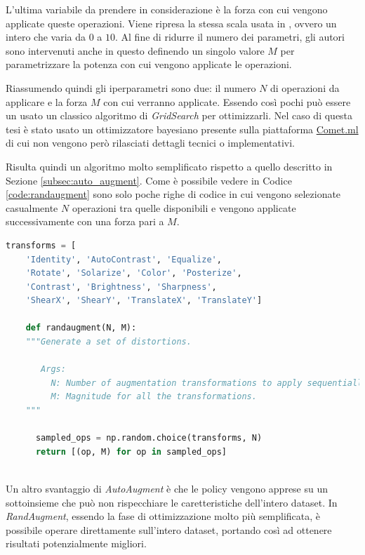 L'ultima variabile da prendere in considerazione è la forza con cui vengono applicate queste operazioni. Viene ripresa la stessa scala usata in \cite{DBLP:journals/corr/abs-1805-09501}, ovvero un intero che varia da $0$ a $10$.
Al fine di ridurre il numero dei parametri, gli autori sono intervenuti anche in questo definendo un singolo valore $M$ per parametrizzare la potenza con cui vengono applicate le operazioni. 

Riassumendo quindi gli iperparametri sono due: il numero $N$ di operazioni da applicare e la forza $M$ con cui verranno applicate. Essendo così pochi può essere un usato un classico algoritmo di \textit{GridSearch} per ottimizzarli. Nel caso di questa tesi è stato usato un ottimizzatore bayesiano presente sulla piattaforma \href{https://www.comet.ml/}{Comet.ml} di cui non vengono però rilasciati dettagli tecnici o implementativi.

Risulta quindi un algoritmo molto semplificato rispetto a quello descritto in Sezione \ref{subsec:auto_augment}. Come è possibile vedere in Codice \ref{code:randaugment} sono solo poche righe di codice in cui vengono selezionate casualmente $N$ operazioni tra quelle disponibili e vengono applicate successivamente con una forza pari a $M$.
\begin{lstlisting}[caption={Algoritmo di RandAugment in Python \cite{DBLP:journals/corr/abs-1909-13719}}, language=Python, label=code:randaugment]
    transforms = [
    'Identity', 'AutoContrast', 'Equalize', 
    'Rotate', 'Solarize', 'Color', 'Posterize',
    'Contrast', 'Brightness', 'Sharpness', 
    'ShearX', 'ShearY', 'TranslateX', 'TranslateY']
    
    def randaugment(N, M): 
    """Generate a set of distortions.
    
       Args:
         N: Number of augmentation transformations to apply sequentially.
         M: Magnitude for all the transformations.
    """
    
      sampled_ops = np.random.choice(transforms, N)
      return [(op, M) for op in sampled_ops]
    
\end{lstlisting}
\label{fig:algorithm}
Un altro svantaggio di \textit{AutoAugment} è che le policy vengono apprese su un sottoinsieme che può non rispecchiare le caretteristiche dell'intero dataset. In \textit{RandAugment}, essendo la fase di ottimizzazione molto più semplificata, è possibile operare direttamente sull'intero dataset, portando così ad ottenere risultati potenzialmente migliori.

